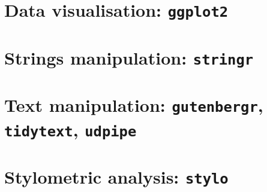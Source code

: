 \documentclass[
]{book}
\begin{document}
\hypertarget{ggplot2}{%
\chapter{\texorpdfstring{Data visualisation: \texttt{ggplot2}}{Data visualisation: ggplot2}}\label{ggplot2}}

\hypertarget{stringr}{%
\chapter{\texorpdfstring{Strings manipulation: \texttt{stringr}}{Strings manipulation: stringr}}\label{stringr}}

\hypertarget{texts}{%
\chapter{\texorpdfstring{Text manipulation: \texttt{gutenbergr}, \texttt{tidytext}, \texttt{udpipe}}{Text manipulation: gutenbergr, tidytext, udpipe}}\label{texts}}

\hypertarget{stylo}{%
\chapter{\texorpdfstring{Stylometric analysis: \texttt{stylo}}{Stylometric analysis: stylo}}\label{stylo}}

\backmatter
  
\end{document}
